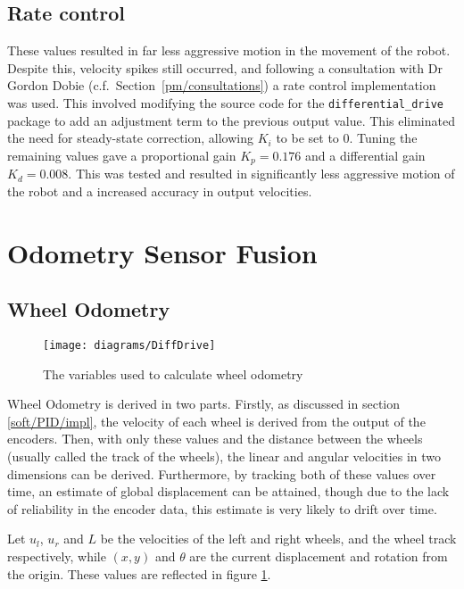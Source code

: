 \subsection{Rate control}

These values resulted in far less aggressive motion in the movement of the
robot. Despite this, velocity spikes still occurred, and following a
consultation with Dr Gordon Dobie (c.f.\ Section~\ref{pm/consultations}) a
rate control implementation was used. This involved modifying the source
code for the \verb|differential_drive| package to add an adjustment term to the
previous output value. This eliminated the need for steady-state correction,
allowing $K_i$ to be set to $0$. Tuning the remaining values gave a proportional
gain $K_p = 0.176$ and a differential gain $K_d = 0.008$. This was tested and
resulted in significantly less aggressive motion of the robot and a increased
accuracy in output velocities.


\section{Odometry Sensor Fusion}\label{soft/odometry}

\subsection{Wheel Odometry}\label{soft/odometry/wheel}

\begin{figure}[!ht]
	\centering
	\texttt{[image: diagrams/DiffDrive]}
	\caption{The variables used to calculate wheel odometry}
	\label{fig:diff_drive_diagram}
\end{figure}

Wheel Odometry is derived in two parts. Firstly, as discussed in section
\ref{soft/PID/impl}, the velocity of each wheel is derived from the output of the
encoders. Then, with only these values and the distance between the wheels
(usually called the track of the wheels), the linear and angular velocities in two
dimensions can be derived. Furthermore, by tracking both of these values over
time, an estimate of global displacement can be attained, though due to the lack
of reliability in the encoder data, this estimate is very likely to drift over
time.

Let $u_l$, $u_r$ and $L$ be the velocities of the left and right wheels, and the
wheel track respectively, while $(x, y)$ and $\theta$ are the current displacement
and rotation from the origin. These values are reflected in figure \ref{fig:diff_drive_diagram}.

